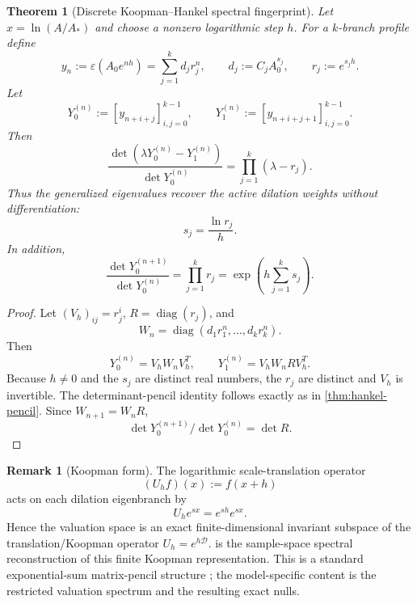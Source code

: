 \documentclass[aps,prd,reprint,onecolumn,nofootinbib,superscriptaddress,showkeys]{revtex4-2}
\numberwithin{equation}{section}
\theoremstyle{definition}
\newtheorem{remark}{Remark}[section]
\theoremstyle{plain}
\newtheorem{theorem}{Theorem}[section]
\newcommand{\Dil}{\mathscr D}
\newcommand{\diag}{\operatorname{diag}}
\begin{document}
\begin{theorem}[Discrete Koopman--Hankel spectral fingerprint]\label{thm:discrete-hankel}
Let $x=\ln(A/A_*)$ and choose a nonzero logarithmic step $h$.  For a $k$-branch profile define
\[
y_n:=\varepsilon(A_0e^{nh})
=\sum_{j=1}^k d_j r_j^n,
\qquad
d_j:=C_jA_0^{s_j},
\qquad
r_j:=e^{s_jh}.
\]
Let
\begin{equation}
Y_0^{(n)}:=[y_{n+i+j}]_{i,j=0}^{k-1},
\qquad
Y_1^{(n)}:=[y_{n+i+j+1}]_{i,j=0}^{k-1}.
\end{equation}
Then
\begin{equation}
\boxed{
\frac{\det(\lambda Y_0^{(n)}-Y_1^{(n)})}
{\det Y_0^{(n)}}
=
\prod_{j=1}^k(\lambda-r_j).
}
\end{equation}
Thus the generalized eigenvalues recover the active dilation weights without differentiation:
\begin{equation}
\boxed{
s_j=\frac{\ln r_j}{h}.
}
\end{equation}
In addition,
\begin{equation}
\boxed{
\frac{\det Y_0^{(n+1)}}{\det Y_0^{(n)}}
=
\prod_{j=1}^k r_j
=
\exp\!\left(h\sum_{j=1}^k s_j\right).
}
\end{equation}
\end{theorem}

\begin{proof}
Let $(V_h)_{ij}=r_j^i$, $R=\diag(r_j)$, and
\[
W_n=\diag(d_1r_1^n,\ldots,d_kr_k^n).
\]
Then
\[
Y_0^{(n)}=V_hW_nV_h^T,
\qquad
Y_1^{(n)}=V_hW_nRV_h^T.
\]
Because $h\neq0$ and the $s_j$ are distinct real numbers, the $r_j$ are distinct and $V_h$ is invertible.  The determinant-pencil identity follows exactly as in \cref{thm:hankel-pencil}.  Since $W_{n+1}=W_nR$,
\[
\det Y_0^{(n+1)}/\det Y_0^{(n)}=\det R.
\]
\end{proof}

\begin{remark}[Koopman form]
The logarithmic scale-translation operator
\[
(U_hf)(x):=f(x+h)
\]
acts on each dilation eigenbranch by
\[
U_he^{sx}=e^{sh}e^{sx}.
\]
Hence the valuation space is an exact finite-dimensional invariant subspace of the translation/Koopman operator $U_h=e^{h\Dil}$.   is the sample-space spectral reconstruction of this finite Koopman representation.  This is a standard exponential-sum matrix-pencil structure \cite{HuaSarkar1990,PeterPlonka2013,FischerEtAl2020}; the model-specific content is the restricted valuation spectrum and the resulting exact nulls.
\end{remark}
\end{document}
